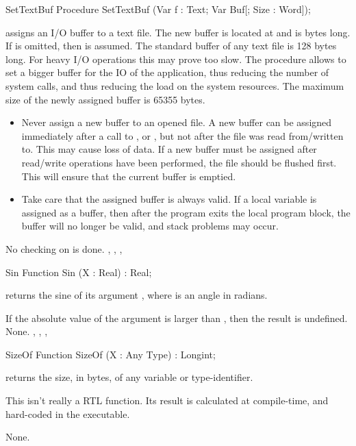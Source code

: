 \begin{procedure}{SetTextBuf}
\Declaration
Procedure SetTextBuf (Var f : Text; Var Buf[; Size : Word]);

\Description
{} assigns an I/O buffer to a text file. The new buffer is
located at  and is  bytes long. If  is omitted,
then  is assumed.
The standard buffer of any text file is 128 bytes long. For heavy I/O
operations this may prove too slow. The  procedure allows
to set a bigger buffer for the IO of the application, thus reducing the number of
system calls, and thus reducing the load on the system resources.
The maximum size of the newly assigned buffer is 65355 bytes.
\begin{remark}
\begin{itemize}
\item Never assign a new buffer to an opened file. A
new buffer can be assigned immediately after a call to ,  or
, but not after the file was read from/written to. This may cause
loss of data. If a new buffer must be assigned after read/write
operations have been performed, the file should be flushed first.
This will ensure that the current buffer is emptied.
\item Take care that the assigned buffer is always valid. If a local variable is
assigned as a buffer, then after the program exits the local program block,
the buffer will no longer be valid, and stack problems may occur.
\end{itemize}
\end{remark}
\Errors
No checking on  is done.
\SeeAlso
{}, , , 
\end{procedure}


\begin{function}{Sin}
\Declaration
Function Sin (X : Real) : Real;

\Description
{} returns the sine of its argument , where  is an
angle in radians.

If the absolute value of the argument is larger than , then the
result is undefined.
\Errors
None.
\SeeAlso
{}, , , 
\end{function}


\begin{function}{SizeOf}
\Declaration
Function SizeOf (X : Any Type) : Longint;

\Description
{} returns the size, in bytes, of any variable or type-identifier.
\begin{remark}
This isn't really a RTL function. Its result is calculated at
compile-time, and hard-coded in the executable.
\end{remark}
\Errors
None.
\SeeAlso
{}
\end{function}

